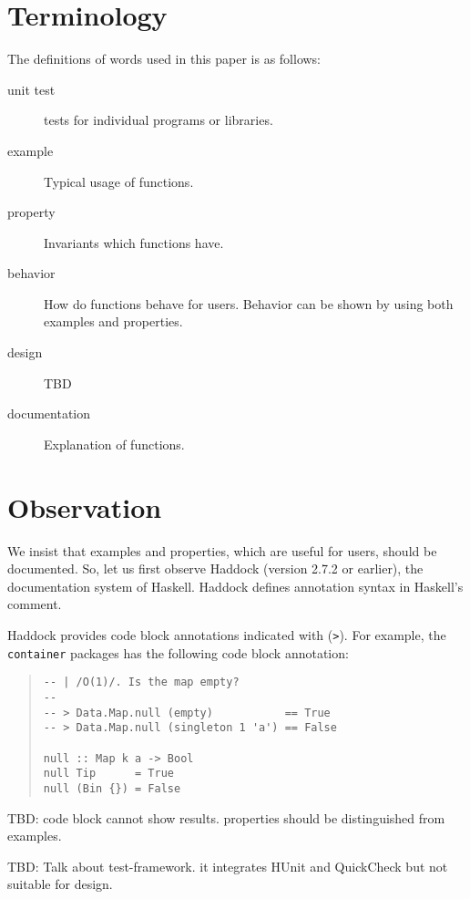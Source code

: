 \documentclass[preprint]{sigplanconf}
\begin{document}
\section{Terminology}

The definitions of words used in this paper is as follows:

\begin{description}
\item[unit test] tests for individual programs or libraries.
\item[example] Typical usage of functions.
\item[property] Invariants which functions have.
\item[behavior] How do functions behave for users. Behavior can be shown by using both examples and properties.
\item[design] TBD
\item[documentation] Explanation of functions.
\end{description}

\section{Observation}

We insist that examples and properties, which are useful for users, should be
documented.
So, let us first observe Haddock (version 2.7.2 or earlier), the documentation system of Haskell. 
Haddock defines annotation syntax in Haskell's comment.

Haddock provides code block annotations indicated with ({\tt >}).
For example, the {\tt container} packages has the following code block annotation:

\begin{quote}
\begin{verbatim}
-- | /O(1)/. Is the map empty?
--
-- > Data.Map.null (empty)           == True
-- > Data.Map.null (singleton 1 'a') == False

null :: Map k a -> Bool
null Tip      = True
null (Bin {}) = False
\end{verbatim}
\end{quote}

TBD: code block cannot show results. properties should be distinguished from examples.

TBD: Talk about test-framework. it integrates HUnit and QuickCheck but not 
suitable for design.
\end{document}
